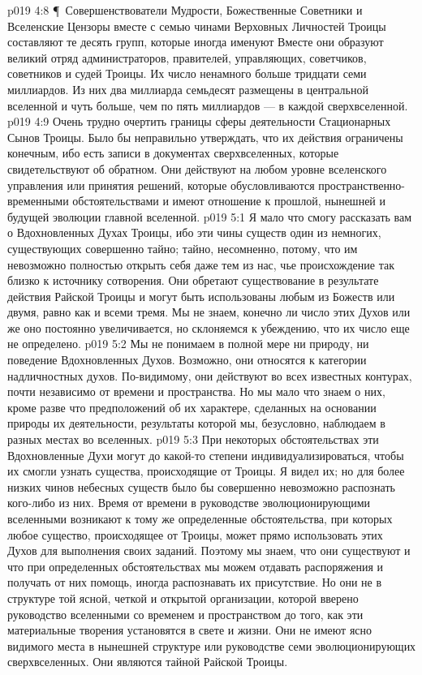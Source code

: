 \vs p019 4:8 \P\ Совершенствователи Мудрости, Божественные Советники и Вселенские Цензоры вместе с семью чинами Верховных Личностей Троицы составляют те десять групп, которые иногда именуют  Вместе они образуют великий отряд администраторов, правителей, управляющих, советчиков, советников и судей Троицы. Их число ненамного больше тридцати семи миллиардов. Из них два миллиарда семьдесят размещены в центральной вселенной и чуть больше, чем по пять миллиардов --- в каждой сверхвселенной.
\vs p019 4:9 Очень трудно очертить границы сферы деятельности Стационарных Сынов Троицы. Было бы неправильно утверждать, что их действия ограничены конечным, ибо есть записи в документах сверхвселенных, которые свидетельствуют об обратном. Они действуют на любом уровне вселенского управления или принятия решений, которые обусловливаются пространственно\hyp{}временными обстоятельствами и имеют отношение к прошлой, нынешней и будущей эволюции главной вселенной.
\vs p019 5:1 Я мало что смогу рассказать вам о Вдохновленных Духах Троицы, ибо эти чины существ один из немногих, существующих совершенно тайно; тайно, несомненно, потому, что им невозможно полностью открыть себя даже тем из нас, чье происхождение так близко к источнику сотворения. Они обретают существование в результате действия Райской Троицы и могут быть использованы любым из Божеств или двумя, равно как и всеми тремя. Мы не знаем, конечно ли число этих Духов или же оно постоянно увеличивается, но склоняемся к убеждению, что их число еще не определено.
\vs p019 5:2 Мы не понимаем в полной мере ни природу, ни поведение Вдохновленных Духов. Возможно, они относятся к категории надличностных духов. По\hyp{}видимому, они действуют во всех известных контурах, почти независимо от времени и пространства. Но мы мало что знаем о них, кроме разве что предположений об их характере, сделанных на основании природы их деятельности, результаты которой мы, безусловно, наблюдаем в разных местах во вселенных.
\vs p019 5:3 При некоторых обстоятельствах эти Вдохновленные Духи могут до какой\hyp{}то степени индивидуализироваться, чтобы их смогли узнать существа, происходящие от Троицы. Я видел их; но для более низких чинов небесных существ было бы совершенно невозможно распознать кого\hyp{}либо из них. Время от времени в руководстве эволюционирующими вселенными возникают к тому же определенные обстоятельства, при которых любое существо, происходящее от Троицы, может прямо использовать этих Духов для выполнения своих заданий. Поэтому мы знаем, что они существуют и что при определенных обстоятельствах мы можем отдавать распоряжения и получать от них помощь, иногда распознавать их присутствие. Но они не в структуре той ясной, четкой и открытой организации, которой вверено руководство вселенными со временем и пространством до того, как эти материальные творения установятся в свете и жизни. Они не имеют ясно видимого места в нынешней структуре или руководстве семи эволюционирующих сверхвселенных. Они являются тайной Райской Троицы.
